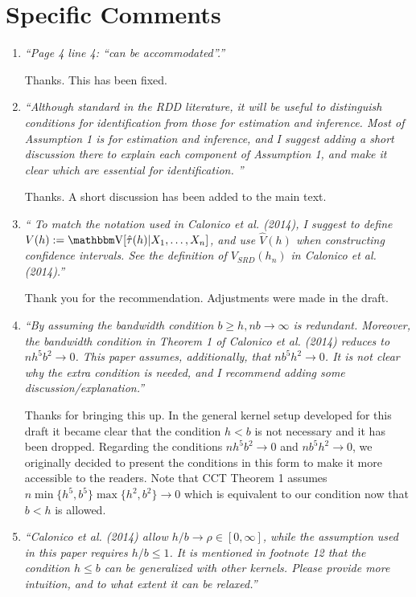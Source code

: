 \documentclass[12pt,fleqn]{article}
\begin{document}
\section{Specific Comments}

\begin{enumerate}

 \item  \textit{``Page 4 line 4: ``can be accommodated''.''}

 Thanks. This has been fixed.

\item \textit{``Although standard in the RDD literature, it will be useful to distinguish conditions for identification from those for estimation and inference. Most of Assumption 1 is for
estimation and inference, and I suggest adding a short discussion there to explain each component of Assumption 1, and make it clear which are essential for identification. ''}

 Thanks. A short discussion has been added to the main text.
  

\item \textit{`` To match the notation used in Calonico et al. (2014), I suggest to define $V(h) :=\V[\hat{\tau}(h)|X_{1}, \dots ,X_{n}]$, and use $\hat{V}(h)$ when constructing confidence intervals. See the definition of $V_{SRD}(h_{n})$ in Calonico et al. (2014).''}

 Thank you for the recommendation. Adjustments were made in the draft.

\item \textit{``By assuming the bandwidth condition $b \geq h, nb \rightarrow \infty$ is redundant. Moreover, the bandwidth condition in Theorem 1 of Calonico et al. (2014) reduces to $nh^{5}b^{2} \rightarrow 0$. This paper assumes, additionally, that $nb^{5}h^{2} \rightarrow 0$. It is not clear why the extra condition is needed, and I recommend adding some discussion/explanation.''}

  Thanks for bringing this up. In the general kernel setup developed for this draft it became clear that the condition $h<b$ is not necessary and it has been dropped. Regarding the conditions $nh^{5}b^{2} \rightarrow 0$ and $nb^{5}h^{2} \rightarrow 0$, we originally decided to present the conditions in this form to make it more accessible to the readers. Note that CCT Theorem 1 assumes $n \min\{h^{5},b^{5}\}\max\{h^{2}, b^{2}\} \rightarrow 0$ which is equivalent to our condition now that $b < h$ is allowed.


\item \textit{``Calonico et al. (2014) allow $h/b \rightarrow \rho \in [0,\infty]$, while the assumption used in this paper requires $h/b \leq 1$. It is mentioned in footnote 12 that the condition $h \leq b$ can be generalized with other kernels. Please provide more intuition, and to what extent it can be relaxed.''}


\end{enumerate}
\end{document}
